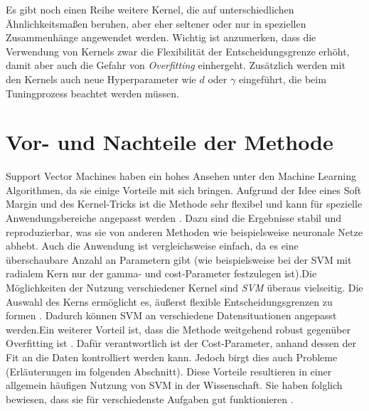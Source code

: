 \documentclass[
]{article}
\begin{document}
Es gibt noch einen Reihe weitere Kernel, die auf unterschiedlichen
Ähnlichkeitsmaßen beruhen, aber eher seltener oder nur in speziellen
Zusammenhänge angewendet werden. Wichtig ist anzumerken, dass die
Verwendung von Kernels zwar die Flexibilität der Entscheidungsgrenze
erhöht, damit aber auch die Gefahr von \textit{Overfitting} einhergeht.
Zusätzlich werden mit den Kernels auch neue Hyperparameter wie \(d\)
oder \(\gamma\) eingeführt, die beim Tuningprozess beachtet werden
müssen.

\section{Vor- und Nachteile der Methode}

Support Vector Machines haben ein hohes Ansehen unter den Machine
Learning Algorithmen, da sie einige Vorteile mit sich bringen. Aufgrund
der Idee eines Soft Margin und des Kernel-Tricks ist die Methode sehr
flexibel und kann für spezielle Anwendungsbereiche angepasst werden
\parencite{bennettSupportVectorMachines2000}. Dazu sind die Ergebnisse
stabil und reproduzierbar, was sie von anderen Methoden wie
beispielsweise neuronale Netze abhebt. Auch die Anwendung ist
vergleichsweise einfach, da es eine überschaubare Anzahl an Parametern
gibt (wie beispielsweise bei der SVM mit radialem Kern nur der gamma-
und cost-Parameter festzulegen ist).\newline Die Möglichkeiten der
Nutzung verschiedener Kernel sind \textit{SVM} überaus vielseitig. Die
Auswahl des Kerns ermöglicht es, äußerst flexible Entscheidungsgrenzen
zu formen \parencite{kuhnAppliedPredictiveModeling2013}. Dadurch können
SVM an verschiedene Datensituationen angepasst werden.\newline Ein
weiterer Vorteil ist, dass die Methode weitgehend robust gegenüber
Overfitting ist \parencite{kuhnAppliedPredictiveModeling2013}. Dafür
verantwortlich ist der Cost-Parameter, anhand dessen der Fit an die
Daten kontrolliert werden kann. Jedoch birgt dies auch Probleme
(Erläuterungen im folgenden Abschnitt). Diese Vorteile resultieren in
einer allgemein häufigen Nutzung von SVM in der Wissenschaft. Sie haben
folglich bewiesen, dass sie für verschiedenste Aufgaben gut
funktionieren \parencite{kuhnAppliedPredictiveModeling2013}.
\end{document}
